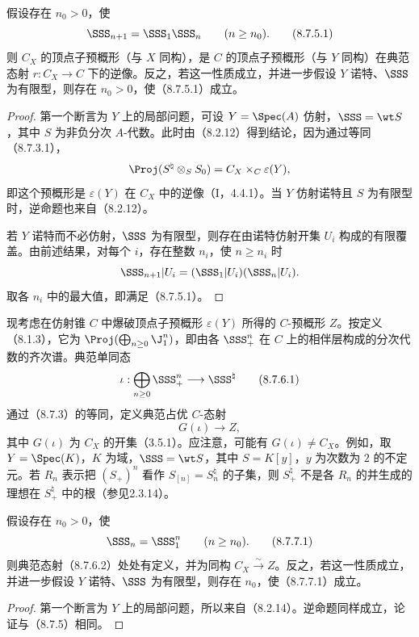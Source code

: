假设存在 $n_0>0$，使
\begin{equation}
\SSS_{n+1}=\SSS_1\SSS_n\qquad(n\geq n_0).
\tag{8.7.5.1}
\end{equation}
则 $C_X$ 的顶点子预概形（与 $X$ 同构），是 $C$ 的顶点子预概形（与 $Y$ 同构）在典范态射 $r:C_X\to C$ 下的逆像。反之，若这一性质成立，并进一步假设 $Y$ 诺特、$\SSS$ 为有限型，则存在 $n_0>0$，使（8.7.5.1）成立。
\begin{proof}
第一个断言为 $Y$ 上的局部问题，可设 $Y=\Spec(A)$ 仿射，$\SSS=\wt S$，其中 $S$ 为非负分次 $A$-代数。此时由（8.2.12）得到结论，因为通过等同（8.7.3.1），
\[
\Proj(S^{\natural}\otimes_S S_0)=C_X\times_C\varepsilon(Y),
\]
即这个预概形是 $\varepsilon(Y)$ 在 $C_X$ 中的逆像（I，4.4.1）。当 $Y$ 仿射诺特且 $S$ 为有限型时，逆命题也来自（8.2.12）。

若 $Y$ 诺特而不必仿射，$\SSS$ 为有限型，则存在由诺特仿射开集 $U_i$ 构成的有限覆盖。由前述结果，对每个 $i$，存在整数 $n_i$，使 $n\geq n_i$ 时
\[
\SSS_{n+1}|U_i=(\SSS_1|U_i)(\SSS_n|U_i).
\]
取各 $n_i$ 中的最大值，即满足（8.7.5.1）。
\end{proof}

现考虑在仿射锥 $C$ 中爆破顶点子预概形 $\varepsilon(Y)$ 所得的 $C$-预概形 $Z$。按定义（8.1.3），它为 $\Proj(\bigoplus_{n\geq0}\J_1^n)$，即由各 $\SSS_+^n$ 在 $C$ 上的相伴层构成的分次代数的齐次谱。典范单同态
\begin{equation}
\iota:\bigoplus_{n\geq0}\SSS_+^n\longrightarrow\SSS^{\natural}
\tag{8.7.6.1}
\end{equation}
通过（8.7.3）的等同，定义典范占优 $C$-态射
\begin{equation}
G(\iota)\longrightarrow Z,
\tag{8.7.6.2}
\end{equation}
其中 $G(\iota)$ 为 $C_X$ 的开集（3.5.1）。应注意，可能有 $G(\iota)\ne C_X$。例如，取 $Y=\Spec(K)$，$K$ 为域，$\SSS=\wt S$，其中 $S=K[y]$，$y$ 为次数为 $2$ 的不定元。若 $R_n$ 表示把 $(S_+)^n$ 看作 $S_{[n]}=S_n^{\natural}$ 的子集，则 $S_+^{\natural}$ 不是各 $R_n$ 的并生成的理想在 $S_+^{\natural}$ 中的根（参见2.3.14）。

假设存在 $n_0>0$，使
\begin{equation}
\SSS_n=\SSS_1^n\qquad(n\geq n_0).
\tag{8.7.7.1}
\end{equation}
则典范态射（8.7.6.2）处处有定义，并为同构 $C_X\xrightarrow{\sim}Z$。反之，若这一性质成立，并进一步假设 $Y$ 诺特、$\SSS$ 为有限型，则存在 $n_0$，使（8.7.7.1）成立。
\begin{proof}
第一个断言为 $Y$ 上的局部问题，所以来自（8.2.14）。逆命题同样成立，论证与（8.7.5）相同。
\end{proof}

